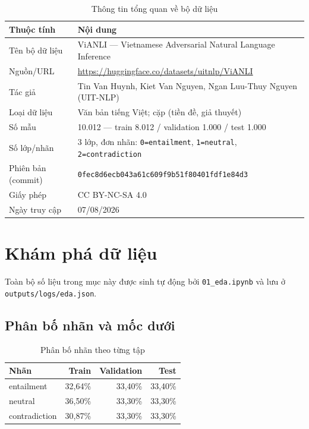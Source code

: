 \documentclass[12pt,a4paper,oneside]{report}
\begin{document}
\begin{table}[H]
\centering
\caption{Thông tin tổng quan về bộ dữ liệu}
\begin{tabularx}{\textwidth}{@{}L{4.2cm}Y@{}}
\toprule
\textbf{Thuộc tính} & \textbf{Nội dung} \\
\midrule
Tên bộ dữ liệu & ViANLI --- Vietnamese Adversarial Natural Language Inference \\
Nguồn/URL & \url{https://huggingface.co/datasets/uitnlp/ViANLI} \\
Tác giả & Tin Van Huynh, Kiet Van Nguyen, Ngan Luu-Thuy Nguyen (UIT-NLP) \\
Loại dữ liệu & Văn bản tiếng Việt; cặp (tiền đề, giả thuyết) \\
Số mẫu & 10.012 --- train 8.012 / validation 1.000 / test 1.000 \\
Số lớp/nhãn & 3 lớp, đơn nhãn: \texttt{0=entailment}, \texttt{1=neutral},
              \texttt{2=contradiction} \\
Phiên bản (commit) & \texttt{0fec8d6ecb043a61c609f9b51f80401fdf1e84d3} \\
Giấy phép & CC BY-NC-SA 4.0 \\
Ngày truy cập & 07/08/2026 \\
\bottomrule
\end{tabularx}
\end{table}

\section{Khám phá dữ liệu}

Toàn bộ số liệu trong mục này được sinh tự động bởi \texttt{01\_eda.ipynb} và lưu ở
\texttt{outputs/\allowbreak logs/\allowbreak eda.json}.

\subsection{Phân bố nhãn và mốc dưới}

\begin{table}[H]
\centering
\caption{Phân bố nhãn theo từng tập}
\begin{tabular}{lrrr}
\toprule
\textbf{Nhãn} & \textbf{Train} & \textbf{Validation} & \textbf{Test} \\
\midrule
entailment    & 32,64\% & 33,40\% & 33,40\% \\
neutral       & 36,50\% & 33,30\% & 33,30\% \\
contradiction & 30,87\% & 33,30\% & 33,30\% \\
\bottomrule
\end{tabular}
\end{table}
\end{document}
